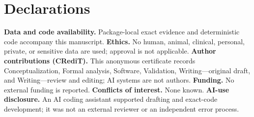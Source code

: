 \documentclass[10pt]{article}
\begin{document}
\section*{Declarations}
\small\noindent
\textbf{Data and code availability.} Package-local exact evidence and
deterministic code accompany this manuscript.
\textbf{Ethics.} No human, animal, clinical, personal, private, or sensitive
data are used; approval is not applicable.
\textbf{Author contributions (CRediT).} This anonymous certificate records
Conceptualization, Formal analysis, Software, Validation, Writing---original
draft, and Writing---review and editing; AI systems are not authors.
\textbf{Funding.} No external funding is reported.
\textbf{Conflicts of interest.} None known.
\textbf{AI-use disclosure.} An AI coding assistant supported drafting and
exact-code development; it was not an external reviewer or an independent
error process.
\end{document}
